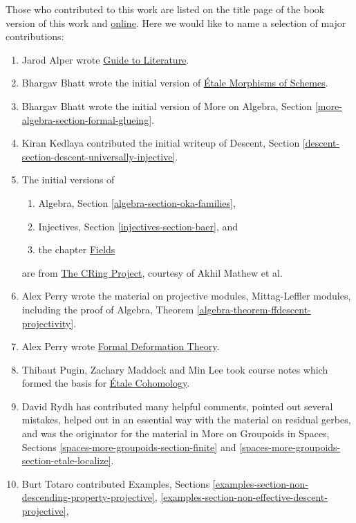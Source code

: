 \documentclass{stacks-project-book}
\theoremstyle{plain}
\theoremstyle{definition}
\theoremstyle{remark}
\numberwithin{equation}{subsection}
\begin{document}
\medskip\noindent
Those who contributed to this work are listed on the title page of the book
version of this work and
\href{http://automorphic.math.columbia.edu/tex/CONTRIBUTORS}{online}.
Here we would like to name a selection of major contributions:
\begin{enumerate}
\item Jarod Alper wrote
\hyperref[guide-section-phantom]{Guide to Literature}.
\item Bhargav Bhatt wrote the initial version of
\hyperref[etale-section-phantom]{\'Etale Morphisms of Schemes}.
\item Bhargav Bhatt wrote the initial version of
More on Algebra, Section \ref{more-algebra-section-formal-glueing}.
\item Kiran Kedlaya contributed the initial writeup of
Descent, Section \ref{descent-section-descent-universally-injective}.
\item The initial versions of
\begin{enumerate}
\item Algebra, Section \ref{algebra-section-oka-families},
\item Injectives, Section \ref{injectives-section-baer}, and
\item the chapter \hyperref[fields-section-phantom]{Fields}
\end{enumerate}
are from
\href{http://people.fas.harvard.edu/~amathew/cr.html}{The CRing Project},
courtesy of Akhil Mathew et al.
\item Alex Perry wrote the material on projective modules,
Mittag-Leffler modules, including the proof of
Algebra, Theorem \ref{algebra-theorem-ffdescent-projectivity}.
\item Alex Perry wrote
\hyperref[formal-defos-section-phantom]{Formal Deformation Theory}.
\item Thibaut Pugin, Zachary Maddock and Min Lee took course notes
which formed the basis for
\hyperref[etale-cohomology-section-phantom]{\'Etale Cohomology}.
\item David Rydh has contributed many helpful comments, pointed out several
mistakes, helped out in an essential way with the material on residual gerbes,
and was the originator for the material in
More on Groupoids in Spaces, Sections
\ref{spaces-more-groupoids-section-finite} and
\ref{spaces-more-groupoids-section-etale-localize}.
\item Burt Totaro contributed Examples, Sections
\ref{examples-section-non-descending-property-projective},
\ref{examples-section-non-effective-descent-projective},

\end{enumerate}
\end{document}

